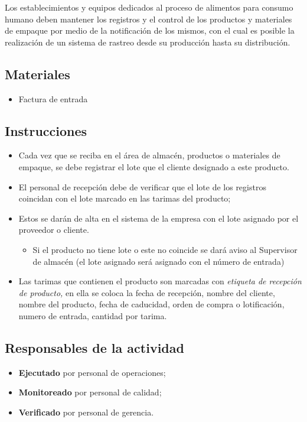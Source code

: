 Los establecimientos y equipos dedicados al proceso de alimentos para consumo humano deben mantener los registros y el control de los productos y materiales de empaque por medio de la notificación de los mismos, con el cual es posible la realización de un sistema de rastreo desde su producción hasta su distribución.

\subsection{Materiales}

\begin{itemize}
	\item Factura de entrada
\end{itemize}

\subsection{Instrucciones}

\begin{itemize}
	\item Cada vez que se reciba en el área de almacén, productos o materiales de empaque, se debe registrar el lote que el cliente designado a este producto.
	\item El personal de recepción debe de verificar que el lote de los registros coincidan con el lote marcado en las tarimas del producto;
	\item Estos se darán de alta en el sistema de la empresa con el lote asignado por el proveedor o cliente.
	\begin{itemize}
		\item Si el producto no tiene lote o este no coincide se dará aviso al Supervisor de almacén (el lote asignado será asignado con el número de entrada)
	\end{itemize}
	\item Las tarimas que contienen el producto son marcadas con \emph{etiqueta de recepción de producto,} en ella se coloca la fecha de recepción, nombre del cliente, nombre del producto, fecha de caducidad, orden de compra o lotificación, numero de entrada, cantidad por tarima.
\end{itemize}

\subsection{Responsables de la actividad}

\begin{itemize}
	\item \textbf{Ejecutado} por personal de operaciones;
	\item \textbf{Monitoreado} por personal de calidad;
	\item \textbf{Verificado} por personal de gerencia.
\end{itemize}

